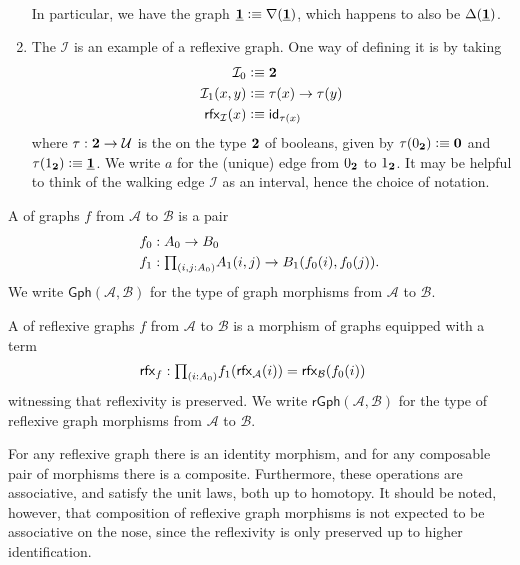 \begin{eg}
\begin{enumerate}
\begin{equation*}
\begin{tikzcd}
\end{tikzcd}
\end{equation*}
In particular, we have the  graph $\underline{\mathbf{1}}\vcentcolon\equiv\nabla(\underline{\mathbf{1}})$, which happens to also be $\Delta(\underline{\mathbf{1}})$. 
\item The  $\mathcal{I}$ is an example of a reflexive graph. One way of defining it is by taking
\begin{align*}
\pts{\mathcal{I}} & \defeq \bool \\
\edg{\mathcal{I}}(x,y) & \defeq \tau(x)\to \tau(y) \\
\rfx{\mathcal{I}}(x) & \defeq \idfunc[\tau(x)]
\end{align*}
where $\tau:\mathbf{2}\to\mathcal{U}$ is the  on the type $\mathbf{2}$ of booleans, given by $\tau({0_{\mathbf{2}}})\vcentcolon\equiv\mathbf{0}$ and $\tau({1_{\mathbf{2}}})\vcentcolon\equiv\underline{\mathbf{1}}$. We write $a$ for the (unique) edge from ${0_{\mathbf{2}}}$ to ${1_{\mathbf{2}}}$. It may be helpful to think of the walking edge $\mathcal{I}$ as an interval, hence the choice of notation.
\end{enumerate}
\end{eg}

\begin{defn}
A  of graphs $f$ from $\mathcal{A}$ to $\mathcal{B}$ is a pair
\begin{align*}
\pts{f} & : \pts{A} \to \pts{B} \\
\edg{f} & : \prd{i,j:\pts{A}} \edg{A}(i,j)\to \edg{B}(\pts{f}(i),\pts{f}(j)).
\end{align*}
We write $\mathsf{Gph}(\mathcal{A},\mathcal{B})$ for the type of graph morphisms from $\mathcal{A}$ to $\mathcal{B}$.

A  of reflexive graphs $f$ from $\mathcal{A}$ to $\mathcal{B}$ is a morphism of graphs equipped with a term
\begin{align*}
\rfx{f} & : \prd{i:\pts{A}} \edg{f}(\rfx{\mathcal{A}}(i))= \rfx{\mathcal{B}}(\pts{f}(i))
\end{align*}
witnessing that reflexivity is preserved. We write $\mathsf{rGph}(\mathcal{A},\mathcal{B})$ for the type of reflexive graph morphisms from $\mathcal{A}$ to $\mathcal{B}$.
\end{defn}

For any reflexive graph there is an identity morphism, and for any composable pair of morphisms there is a composite. Furthermore, these operations are associative, and satisfy the unit laws, both up to homotopy. It should be noted, however, that composition of reflexive graph morphisms is not expected to be associative on the nose, since the reflexivity is only preserved up to higher identification.

